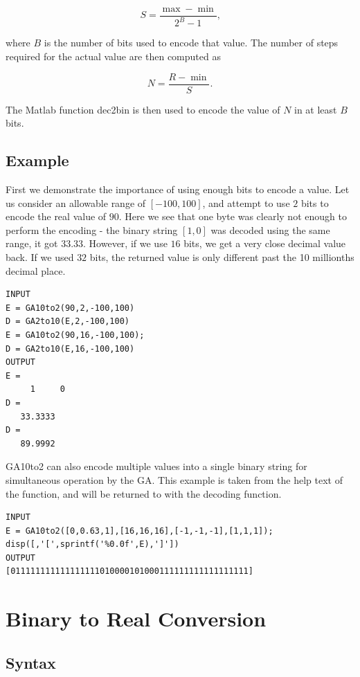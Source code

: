 \documentclass{book}
\newcommand{\textcode}[1]{\textsf{\small #1}}   %
\begin{document}
\begin{equation}
S=\frac{\max -\min }{2^{B}-1}\text{,}  \label{eqn_binencstep}
\end{equation}

where $B$ is the number of bits used to encode that value. The number of
steps required for the actual value are then computed as

\begin{equation}
N=\frac{R-\min }{S}\text{.}  \label{eqn_binencnum}
\end{equation}

The Matlab function \textcode{dec2bin} is then used to encode
the value of $N$ in at least $B$ bits.

\subsection*{Example}

First we demonstrate the importance of using enough bits to encode a value.
Let us consider an allowable range of $\left[ -100,100\right] $, and attempt
to use $2$ bits to encode the real value of $90$. Here we see that one byte
was clearly not enough to perform the encoding - the binary string $\left[
1,0\right] $ was decoded using the same range, it got $33.33$. However, if
we use $16$ bits, we get a very close decimal value back. If we used $32$
bits, the returned value is only different past the 10 millionths decimal
place.
\begin{verbatim}
INPUT
E = GA10to2(90,2,-100,100)
D = GA2to10(E,2,-100,100)
E = GA10to2(90,16,-100,100);
D = GA2to10(E,16,-100,100)
OUTPUT
E =
     1     0
D =
   33.3333
D =
   89.9992
\end{verbatim}
\textcode{GA10to2} can also encode multiple values into a
single binary string for simultaneous operation by the GA. This
example is taken from the help text of the function, and will
be returned to with the decoding function.
\begin{verbatim}
INPUT
E = GA10to2([0,0.63,1],[16,16,16],[-1,-1,-1],[1,1,1]);
disp([,'[',sprintf('%0.0f',E),']'])
OUTPUT
[011111111111111111010000101000111111111111111111]
\end{verbatim}

\section{Binary to Real Conversion}

\subsection*{Syntax}
\end{document}
